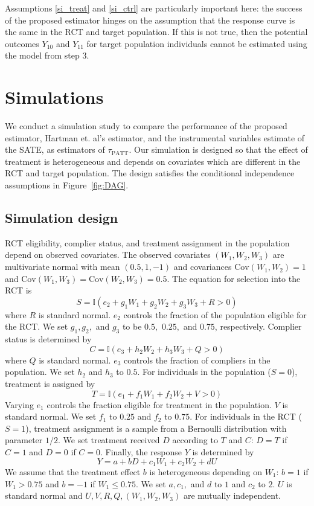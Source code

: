 \documentclass[12pt]{article}
\newcommand{\ind}{\mathbb{I}} %
\newcommand{\cov}{\mathrm{Cov}}
\begin{document}
Assumptions \eqref{si_treat} and \eqref{si_ctrl} are particularly important here: the success of the proposed estimator hinges on the assumption that the response curve is the same in the RCT and target population.  If this is not true, then the potential outcomes $Y_{10}$ and $Y_{11}$ for target population individuals cannot be estimated using the model from step 3.

\section{Simulations}
We conduct a simulation study to compare the performance of the proposed estimator, Hartman et. al's estimator, and the instrumental variables estimate of the SATE, as estimators of $\tau_{\text{PATT}}$.  Our simulation is designed so that the effect of treatment is heterogeneous and depends on covariates which are different in the RCT and target population. The design satisfies the conditional independence assumptions in Figure~\ref{fig:DAG}.

\subsection{Simulation design}
RCT eligibility, complier status, and treatment assignment in the population depend on observed covariates. 
The observed covariates $(W_1, W_2, W_3)$ are multivariate normal with mean $(0.5, 1, -1)$ and covariances $\cov(W_1, W_2) = 1$ and $\cov(W_1, W_3) = \cov(W_2, W_3) = 0.5$. 
 The  equation for selection into the RCT is
 $$ S = \ind(e_2 + g_1W_1 + g_2W_2 + g_3W_3 + R > 0)$$
  where $R$ is standard normal. $e_2$ controls the fraction of the population eligible for the RCT. We set $g_1, g_2,$ and $g_3$ to be $0.5,$ $0.25,$ and $0.75$, respectively.
Complier status is determined by
$$C = \ind(e_3 + h_2W_2 + h_3W_3 + Q > 0)$$
where $Q$ is standard normal. $e_3$ controls the fraction of compliers in the population. We set $h_2$ and $h_3$ to $0.5$.
 For individuals in the population ($S=0$),  treatment is assigned by
  $$T = \ind(e_1 + f_1W_1 + f_2W_2 + V > 0)$$
Varying $e_1$ controls the fraction eligible for treatment in the population. $V$ is standard normal. We set $f_1$ to $0.25$ and $f_2$ to $0.75$.  For individuals in the RCT ($S=1$), treatment assignment is a sample from a Bernoulli distribution with parameter $1/2$.
We set treatment received $D$ according to $T$ and $C$: $D = T$ if $C=1$ and $D = 0$ if $C=0$.
Finally, the response $Y$ is determined by 
$$Y = a + bD + c_1W_1 + c_2W_2 + dU$$
 We assume that the treatment effect $b$ is heterogeneous depending on $W_1$: $b = 1$ if $W_1 > 0.75$ and $b=-1$ if $W_1 \leq 0.75$.   We set $a, c_1,$ and $d$ to $1$ and $c_2$ to $2$. $U$ is standard normal and $U, V, R, Q, (W_1, W_2, W_3)$ are mutually independent.
 
\end{document}
